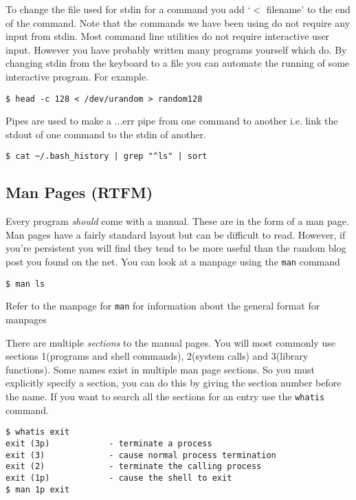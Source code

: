\documentclass[10pt]{article}
\begin{document}
  To change the file used for stdin for a command you add `$<$ filename' to the end of the command.
  Note that the commands we have been using do not require any input from stdin. Most command line utilities do not require interactive user input. However you have probably written many programs yourself which do. By changing stdin from the keyboard to a file you can automate the running of some interactive program. For example.

\begin{verbatim}
$ head -c 128 < /dev/urandom > random128
\end{verbatim}

  Pipes are used to make a ...err pipe from one command to another i.e. link the stdout of one command
  to the stdin of another.

\begin{verbatim}
$ cat ~/.bash_history | grep "^ls" | sort
\end{verbatim}  

   
  \subsection{Man Pages (RTFM)}
  Every program \textit{should} come with a manual. These are in the form of a man page. Man pages have a fairly standard layout but can be difficult to read. However, if you're persistent you will find they tend to be more useful than the random blog post you found on the net. You can look at a manpage using the \texttt{man} command

\begin{verbatim}
$ man ls
\end{verbatim}

  Refer to the manpage for \texttt{man} for information about the general format for manpages

  There are multiple \textit{sections} to the manual pages. You will most commonly use sections 1(programs and shell commands), 2(system calls) and 3(library functions). Some names exist in multiple
  man page sections. So you must explicitly specify a section, you can do this by giving the section number before the name. If you want to search all the sections for an entry use the \texttt{whatis} command.

\begin{verbatim}
$ whatis exit
exit (3p)            - terminate a process
exit (3)             - cause normal process termination
exit (2)             - terminate the calling process
exit (1p)            - cause the shell to exit
$ man 1p exit
\end{verbatim}
\end{document}
